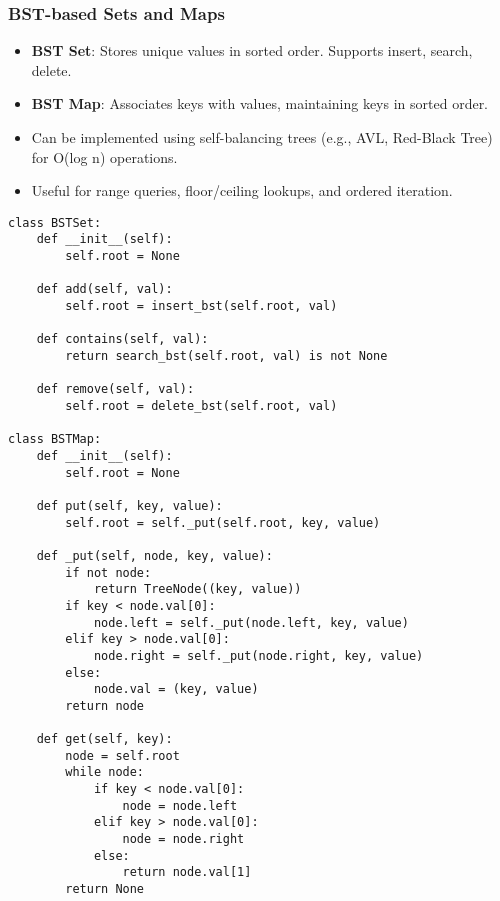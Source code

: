 \subsubsection{BST-based Sets and Maps}

\begin{summary}
    \begin{itemize}
        \item \textbf{BST Set}: Stores unique values in sorted order. Supports insert, search, delete.
        \item \textbf{BST Map}: Associates keys with values, maintaining keys in sorted order.
        \item Can be implemented using self-balancing trees (e.g., AVL, Red-Black Tree) for O(log n) operations.
        \item Useful for range queries, floor/ceiling lookups, and ordered iteration.
    \end{itemize}
\end{summary}

\begin{algo}
\begin{lstlisting}
class BSTSet:
    def __init__(self):
        self.root = None

    def add(self, val):
        self.root = insert_bst(self.root, val)

    def contains(self, val):
        return search_bst(self.root, val) is not None

    def remove(self, val):
        self.root = delete_bst(self.root, val)

class BSTMap:
    def __init__(self):
        self.root = None

    def put(self, key, value):
        self.root = self._put(self.root, key, value)

    def _put(self, node, key, value):
        if not node:
            return TreeNode((key, value))
        if key < node.val[0]:
            node.left = self._put(node.left, key, value)
        elif key > node.val[0]:
            node.right = self._put(node.right, key, value)
        else:
            node.val = (key, value)
        return node

    def get(self, key):
        node = self.root
        while node:
            if key < node.val[0]:
                node = node.left
            elif key > node.val[0]:
                node = node.right
            else:
                return node.val[1]
        return None
\end{lstlisting}
\end{algo}